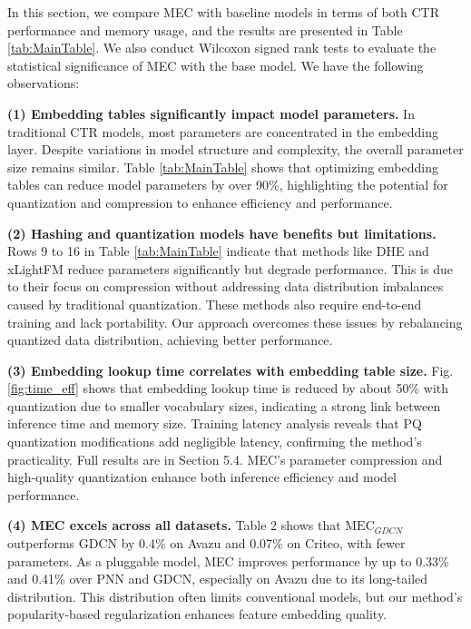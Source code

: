         In this section, we compare MEC with baseline models in terms of both CTR performance and memory usage, and the results are presented in Table \ref{tab:MainTable}. We also conduct Wilcoxon signed rank tests \cite{p_test} to evaluate the statistical significance of MEC with the base model. We have the following observations:
        
\textbf{(1) Embedding tables significantly impact model parameters.} 
In traditional CTR models, most parameters are concentrated in the embedding layer. Despite variations in model structure and complexity, the overall parameter size remains similar. Table \ref{tab:MainTable} shows that optimizing embedding tables can reduce model parameters by over 90\%, highlighting the potential for quantization and compression to enhance efficiency and performance.

\textbf{(2) Hashing and quantization models have benefits but limitations.} 
Rows 9 to 16 in Table \ref{tab:MainTable} indicate that methods like DHE \cite{DHE} and xLightFM \cite{xLightFM} reduce parameters significantly but degrade performance. This is due to their focus on compression without addressing data distribution imbalances caused by traditional quantization. These methods also require end-to-end training and lack portability. Our approach overcomes these issues by rebalancing quantized data distribution, achieving better performance.

\textbf{(3) Embedding lookup time correlates with embedding table size.}
Fig. \ref{fig:time_eff} shows that embedding lookup time is reduced by about 50\% with quantization due to smaller vocabulary sizes, indicating a strong link between inference time and memory size. Training latency analysis reveals that PQ quantization modifications add negligible latency, confirming the method's practicality. Full results are in Section 5.4. MEC's parameter compression and high-quality quantization enhance both inference efficiency and model performance.

\textbf{(4) MEC excels across all datasets.} 
Table 2 shows that $\text{MEC}_{GDCN}$ outperforms GDCN by 0.4\% on Avazu and 0.07\% on Criteo, with fewer parameters. As a pluggable model, MEC improves performance by up to 0.33\% and 0.41\% over PNN and GDCN, especially on Avazu due to its long-tailed distribution. This distribution often limits conventional models, but our method's popularity-based regularization enhances feature embedding quality.











